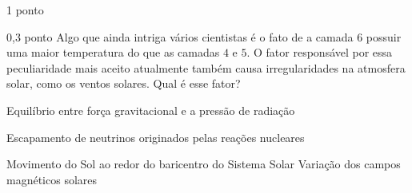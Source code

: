 \documentclass{../lista}
\begin{document}
\begin{questao}{1 ponto}
		\begin{pergunta}{0,3 ponto}
			Algo que ainda intriga vários cientistas é o fato de a camada $6$ possuir uma maior temperatura do que as camadas $4$ e $5$. O fator responsável por essa peculiaridade mais aceito atualmente também causa irregularidades na atmosfera solar, como os ventos solares. Qual é esse fator?
			\begin{alternativas}
				\item Equilíbrio entre força gravitacional e a pressão de radiação
				\item Escapamento de neutrinos originados pelas reações nucleares
				\item Movimento do Sol ao redor do baricentro do Sistema Solar
				\alternativaMarcada Variação dos campos magnéticos solares
			\end{alternativas}
		\end{pergunta}
	\end{questao}
\end{document}
